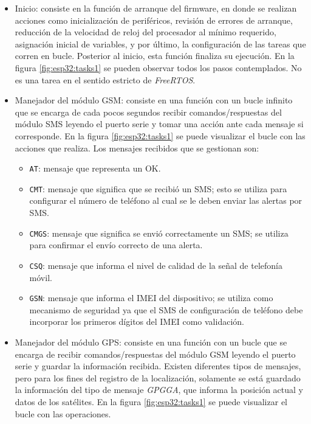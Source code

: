 \begin{itemize}
	\item Inicio: consiste en la función de arranque del firmware, en donde se realizan acciones como inicialización de periféricos, revisión de errores de arranque, reducción de la velocidad de reloj del procesador al mínimo requerido, asignación inicial de variables, y por último, la configuración de las tareas que corren en bucle. Posterior al inicio, esta función finaliza su ejecución. En la figura \ref{fig:esp32:tasks1} se pueden observar todos los pasos contemplados. No es una tarea en el sentido estricto de \textit{FreeRTOS}.
	\item Manejador del módulo GSM: consiste en una función con un bucle infinito que se encarga de cada pocos segundos recibir comandos/respuestas del módulo SMS leyendo el puerto serie y tomar una acción ante cada mensaje si corresponde. En la figura \ref{fig:esp32:tasks1} se puede visualizar el bucle con las acciones que realiza. Los mensajes recibidos que se gestionan son:
		\begin{itemize}
			\item \texttt{AT}: mensaje que representa un OK.
			\item \texttt{CMT}: mensaje que significa que se recibió un SMS; esto se utiliza para configurar el número de teléfono al cual se le deben enviar las alertas por SMS.
			\item \texttt{CMGS}: mensaje que significa se envió correctamente un SMS; se utiliza para confirmar el envío correcto de una alerta.
			\item \texttt{CSQ}: mensaje que informa el nivel de calidad de la señal de telefonía móvil.
			\item \texttt{GSN}: mensaje que informa el IMEI del dispositivo; se utiliza como mecanismo de seguridad ya que el SMS de configuración de teléfono debe incorporar los primeros dígitos del IMEI como validación.		
		\end{itemize}
		\item Manejador del módulo GPS: consiste en una función con un bucle que se encarga de recibir comandos/respuestas del módulo GSM leyendo el puerto serie y guardar la información recibida. Existen diferentes tipos de mensajes, pero para los fines del registro de la localización, solamente se está guardado la información del tipo de mensaje \textit{GPGGA}, que informa la posición actual y datos de los satélites\citep{NMEA:2}. En la figura \ref{fig:esp32:tasks1} se puede visualizar el bucle con las operaciones.
		\begin{figure}[H]

\end{figure}
\end{itemize}
